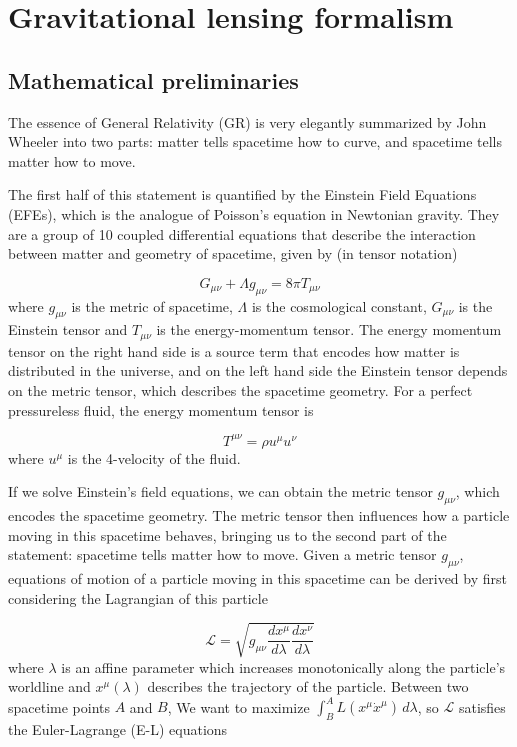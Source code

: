 \chapter{Gravitational lensing formalism}
\label{chapter:gravitational-lensing-formalism}

\section{Mathematical preliminaries}

The essence of General Relativity (GR) is very elegantly summarized by John Wheeler \citep[pg.235]{wheeler2000geons} into two parts: matter tells spacetime how to curve, and spacetime tells matter how to move. 

The first half of this statement is quantified by the Einstein Field Equations (EFEs), which is the analogue of Poisson's equation in Newtonian gravity. They are a group of 10 coupled differential equations that describe the interaction between matter and geometry of spacetime, given by (in tensor notation)

\begin{equation}
  G_{\mu \nu} + \Lambda g_{\mu \nu} = 8\pi T_{\mu \nu}
  \label{eq:efes}
\end{equation}
where $g_{\mu \nu}$ is the metric of spacetime, $\Lambda$ is the cosmological constant, $G_{\mu \nu}$ is the Einstein tensor and $T_{\mu \nu}$ is the energy-momentum tensor. The energy momentum tensor on the right hand side is a source term that encodes how matter is distributed in the universe, and on the left hand side the Einstein tensor depends on the metric tensor, which describes the spacetime geometry. For a perfect pressureless fluid, the energy momentum tensor is

\begin{equation}
  T^{\mu \nu} = \rho u^{\mu} u^{\nu}
\end{equation}
where $u^{\mu}$ is the 4-velocity of the fluid. 

If we solve Einstein's field equations, we can obtain the metric tensor $g_{\mu \nu}$, which encodes the spacetime geometry. The metric tensor then influences how a particle moving in this spacetime behaves, bringing us to the second part of the statement: spacetime tells matter how to move. Given a metric tensor $g_{\mu \nu}$, equations of motion of a particle moving in this spacetime can be derived by first considering the Lagrangian of this particle

\begin{equation}
  \mathcal{L} = \sqrt{g_{\mu \nu} \frac{dx^{\mu}}{d \lambda} \frac{dx^{\nu}}{d \lambda}}
\end{equation}
where $\lambda$ is an affine parameter which increases monotonically along the particle's worldline and $x^{\mu}(\lambda)$ describes the trajectory of the particle. Between two spacetime points $A$ and $B$, We want to maximize $\int^{A}_{B} L(x^{\mu} \dot{x}^{\mu})\, d \lambda$, so $\mathcal{L}$ satisfies the Euler-Lagrange (E-L) equations

